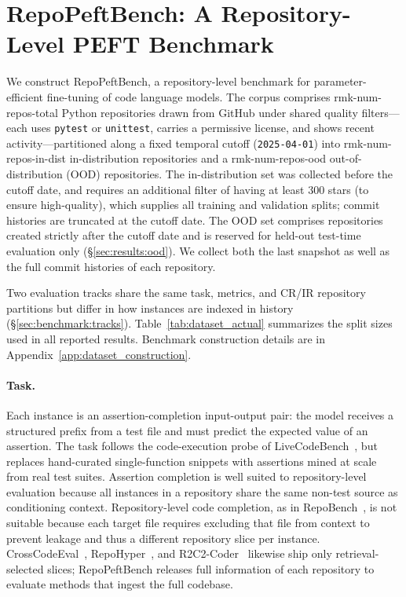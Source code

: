 \documentclass{llmxive}
\providecommand{\UseMacro}[1]{\csname rmk-#1\endcsname}
\providecommand{\repopeftbench}{RepoPeftBench\xspace}
\begin{document}
\section{\repopeftbench{}: A Repository-Level PEFT Benchmark}
\label{sec:benchmark}

We construct \repopeftbench{}, a repository-level benchmark for parameter-efficient fine-tuning of code language models.
The corpus comprises \UseMacro{num-repos-total} Python repositories drawn from GitHub under shared quality filters---each uses \texttt{pytest} or \texttt{unittest}, carries a permissive license, and shows recent activity---partitioned along a fixed temporal cutoff (\texttt{2025-04-01}) into \UseMacro{num-repos-in-dist} in-distribution repositories and a \UseMacro{num-repos-ood} out-of-distribution (OOD) repositories.
The in-distribution set was collected before the cutoff date, and requires an additional filter of having at least 300 stars (to ensure high-quality), which supplies all training and validation splits; commit histories are truncated at the cutoff date. %
The OOD set comprises repositories created strictly after the cutoff date and is reserved for held-out test-time evaluation only (\S\ref{sec:results:ood}).
We collect both the last snapshot as well as the full commit histories of each repository.

Two evaluation tracks share the same task, metrics, and CR/IR repository partitions but differ in how instances are indexed in history (\S\ref{sec:benchmark:tracks}).
Table~\ref{tab:dataset_actual} summarizes the split sizes used in all reported results.
Benchmark construction details are in Appendix~\ref{app:dataset_construction}.

\paragraph{Task.}
Each instance is an assertion-completion input-output pair: the model receives a structured prefix from a test file and must predict the expected value of an assertion.
The task follows the code-execution probe of LiveCodeBench~\cite{jain2025livecodebench}, but replaces hand-curated single-function snippets with assertions mined at scale from real test suites.
Assertion completion is well suited to repository-level evaluation because all instances in a repository share the same non-test source as conditioning context. %
Repository-level code completion, as in RepoBench~\cite{liu2023repobenchbenchmarkingrepositorylevelcode}, is not suitable because each target file requires excluding that file from context to prevent leakage and thus a different repository slice per instance.
CrossCodeEval~\cite{ding2024crosscodeeval}, RepoHyper~\cite{phan2024repohypersearchexpandrefinesemanticgraphs}, and R2C2-Coder~\cite{deng2024r2c2coder} likewise ship only retrieval-selected slices; \repopeftbench{} releases full information of each repository to evaluate methods that ingest the full codebase.
\end{document}
